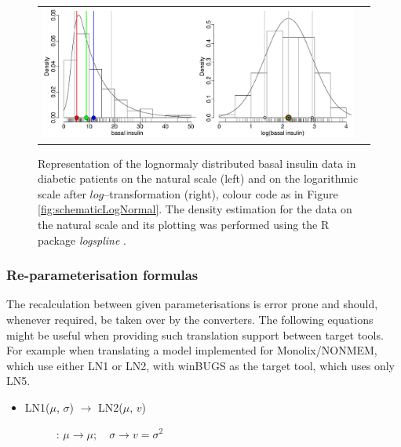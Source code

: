 {%
 

\begin{figure}[htb!]
\centering
\begin{tabular}{cc}
 \includegraphics[width=140mm]{pics/Rudenski_LogNormalNormal}
\end{tabular}
\caption{Representation of the lognormaly distributed basal insulin data in diabetic patients 
\cite{Rudenski:1991aa} on the natural scale (left) and on the logarithmic scale after 
$log$--transformation (right), colour code as in Figure \ref{fig:schematicLogNormal}. 
The density estimation for the data on the natural scale and its plotting was performed 
using the R package \textit{logspline} \cite{Kooperberg:2013}.}
\label{fig:insulinData}
\end{figure}

\subsubsection{Re-parameterisation formulas}
\label{subsubsec:formulas}
The recalculation between given parameterisations is error prone 
and should, whenever required, be taken over by the converters. The 
following equations might be useful when providing such translation support 
between target tools. For example when translating a model implemented 
for Monolix/NONMEM, which use either LN1 or LN2, with winBUGS as the 
target tool, which uses only LN5.\\
\begin{itemize}
\item 
\begin{description}
\item[LN1($\mu$, $\sigma$) $\rightarrow$ LN2($\mu$, $v$)]:
$\mu \rightarrow \mu; \quad \sigma \rightarrow v=\sigma^2$


\end{description}
\end{itemize}}
